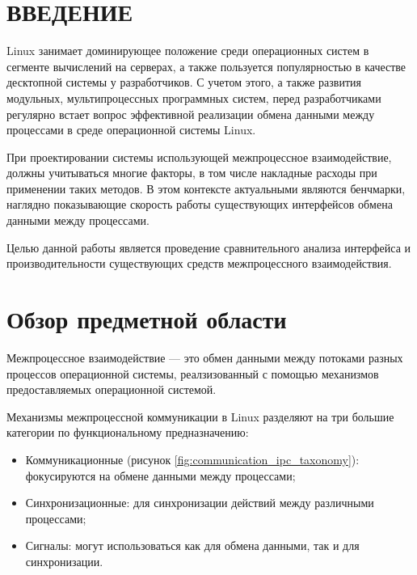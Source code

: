 \documentclass[14pt, russian]{scrartcl}
\newcommand{\refImage}[1]{(рисунок \ref{#1})}
\newcommand{\anonsection}[1]{\cleardoublepage
\phantomsection
\addcontentsline{toc}{section}{\protect\numberline{}#1}
\section*{#1}\vspace*{2.5ex} %
}
\begin{document}

\setlength{\tabcolsep}{3pt}
\newpage
\setcounter{page}{2}

\newpage
\renewcommand\contentsname{\hfill{\normalfont{СОДЕРЖАНИЕ}}\hfill}  %
\tableofcontents
\newpage
\anonsection{ВВЕДЕНИЕ}  %

Linux занимает доминирующее положение среди операционных систем в сегменте
вычислений на серверах\cite{OSMarketShare}, а также пользуется популярностью в
качестве десктопной системы у разработчиков\cite{DevelopersOS}. С учетом этого,
а также развития модульных, мультипроцессных программных систем, перед
разработчиками регулярно встает вопрос эффективной реализации обмена данными
между процессами в среде операционной системы Linux.

При проектировании системы использующей межпроцессное взаимодействие, должны
учитываться многие факторы, в том числе накладные расходы при применении таких
методов. В этом контексте актуальными являются бенчмарки, наглядно показывающие
скорость работы существующих интерфейсов обмена данными между процессами.

Целью данной работы является проведение сравнительного анализа интерфейса и
производительности существующих средств межпроцессного взаимодействия.

\section{Обзор предметной области}

Межпроцессное взаимодействие --- это обмен данными между потоками разных
процессов операционной системы, реалзизованный с помощью механизмов
предоставляемых операционной системой.

Механизмы межпроцессной коммуникации в Linux разделяют на три большие категории
по функциональному предназначению:\cite{kerrisk2010linux}

\begin{itemize}
  \item Коммуникационные \refImage{fig:communication_ipc_taxonomy}: фокусируются на
        обмене данными между процессами;
  \item Синхронизационные: для синхронизации действий между различными
        процессами;
  \item Сигналы: могут использоваться как для обмена данными, так и для
        синхронизации.
\end{itemize}
\end{document}
